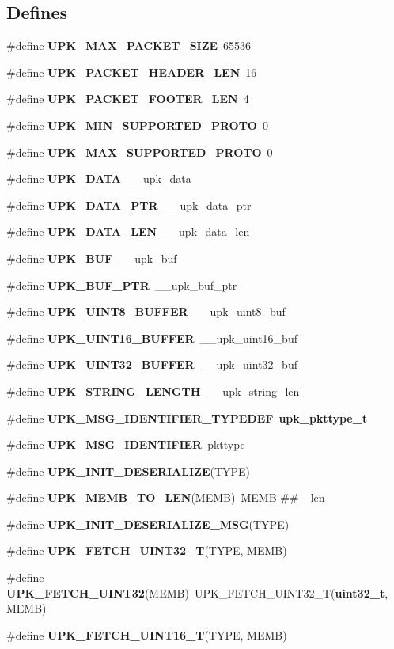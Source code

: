 \subsection*{Defines}
\begin{DoxyCompactItemize}
\item 
\#define {\bf UPK\_\-MAX\_\-PACKET\_\-SIZE}~65536
\item 
\#define {\bf UPK\_\-PACKET\_\-HEADER\_\-LEN}~16
\item 
\#define {\bf UPK\_\-PACKET\_\-FOOTER\_\-LEN}~4
\item 
\#define {\bf UPK\_\-MIN\_\-SUPPORTED\_\-PROTO}~0
\item 
\#define {\bf UPK\_\-MAX\_\-SUPPORTED\_\-PROTO}~0
\item 
\#define {\bf UPK\_\-DATA}~\_\-\_\-upk\_\-data
\item 
\#define {\bf UPK\_\-DATA\_\-PTR}~\_\-\_\-upk\_\-data\_\-ptr
\item 
\#define {\bf UPK\_\-DATA\_\-LEN}~\_\-\_\-upk\_\-data\_\-len
\item 
\#define {\bf UPK\_\-BUF}~\_\-\_\-upk\_\-buf
\item 
\#define {\bf UPK\_\-BUF\_\-PTR}~\_\-\_\-upk\_\-buf\_\-ptr
\item 
\#define {\bf UPK\_\-UINT8\_\-BUFFER}~\_\-\_\-upk\_\-uint8\_\-buf
\item 
\#define {\bf UPK\_\-UINT16\_\-BUFFER}~\_\-\_\-upk\_\-uint16\_\-buf
\item 
\#define {\bf UPK\_\-UINT32\_\-BUFFER}~\_\-\_\-upk\_\-uint32\_\-buf
\item 
\#define {\bf UPK\_\-STRING\_\-LENGTH}~\_\-\_\-upk\_\-string\_\-len
\item 
\#define {\bf UPK\_\-MSG\_\-IDENTIFIER\_\-TYPEDEF}~{\bf upk\_\-pkttype\_\-t}
\item 
\#define {\bf UPK\_\-MSG\_\-IDENTIFIER}~pkttype
\item 
\#define {\bf UPK\_\-INIT\_\-DESERIALIZE}(TYPE)
\item 
\#define {\bf UPK\_\-MEMB\_\-TO\_\-LEN}(MEMB)~MEMB \#\# \_\-len
\item 
\#define {\bf UPK\_\-INIT\_\-DESERIALIZE\_\-MSG}(TYPE)
\item 
\#define {\bf UPK\_\-FETCH\_\-UINT32\_\-T}(TYPE, MEMB)
\item 
\#define {\bf UPK\_\-FETCH\_\-UINT32}(MEMB)~UPK\_\-FETCH\_\-UINT32\_\-T({\bf uint32\_\-t}, MEMB)
\item 
\#define {\bf UPK\_\-FETCH\_\-UINT16\_\-T}(TYPE, MEMB)
\item 

\end{DoxyCompactItemize}
